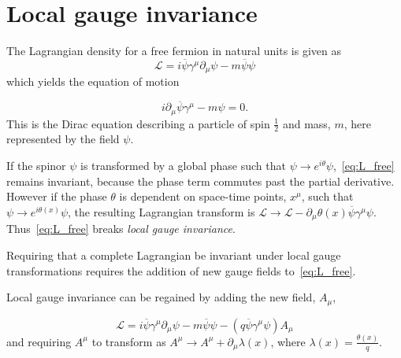 \section{Local gauge invariance}
\label{sec:gauge}
The Lagrangian density for a free fermion in natural units is given as
\begin{equation}
  \label{eq:L_free}
  \mathcal{L} = i\overline{\psi}\gamma^{\mu}\partial_{\mu}\psi - m\overline{\psi}\psi
\end{equation}
which yields the equation of motion

\begin{equation}
 i\partial_{\mu}\overline{\psi}\gamma^{\mu} -  m\psi = 0.
\end{equation}
This is the Dirac equation describing a particle of spin $\frac{1}{2}$ and mass, $m$, here represented by the field $\psi$. 

If the spinor $\psi$ is transformed by a global phase such that $\psi \to e^{i\theta}\psi$,~\autoref{eq:L_free} remains invariant, because the phase term commutes past the partial derivative. However if the phase $\theta$ is dependent on space-time points, $x^{\mu}$, such that $\psi \to e^{i\theta(x)}\psi$, the resulting Lagrangian transform is $\mathcal{L} \to \mathcal{L} - \partial_{\mu}\theta(x)\overline{\psi}\gamma^{\mu}\psi$. Thus~\autoref{eq:L_free} breaks \emph{local gauge invariance}.

Requiring that a complete Lagrangian be invariant under local gauge transformations requires the addition of new gauge fields to~\autoref{eq:L_free}.

Local gauge invariance can be regained by adding the new field, $A_{\mu}$,

\begin{equation}
  \mathcal{L} = i\overline{\psi}\gamma^{\mu}\partial_{\mu}\psi - m\overline{\psi}\psi - (q\overline{\psi}\gamma^{\mu}\psi)A_{\mu}
  \label{eq:L_bound}
\end{equation}
and requiring $A^{\mu}$ to transform as $A^{\mu} \to A^{\mu} + \partial_{\mu}\lambda(x)$, where $\lambda(x) = \frac{\theta(x)}{q}$. %

